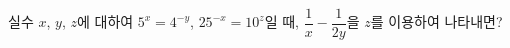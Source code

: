 실수 $x$, $y$, $z$에 대하여 $5^x=4^{-y}$, $25^{-x}=10^z$일 때, $\dfrac{1}{x}-\dfrac{1}{2y}$을 $z$를 이용하여 나타내면? 
